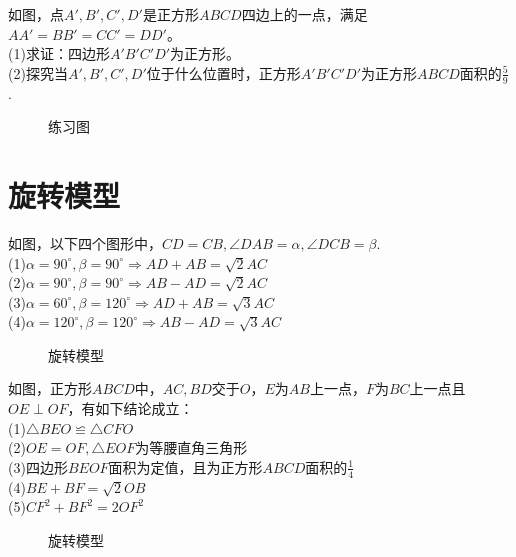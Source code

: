 \begin{problem}
如图，点$A',B',C',D'$是正方形$ABCD$四边上的一点，满足$AA'=BB'=CC'=DD'$。\\
(1)求证：四边形$A'B'C'D'$为正方形。 \\
(2)探究当$A',B',C',D'$位于什么位置时，正方形$A'B'C'D'$为正方形$ABCD$面积的$\frac{5}{9}$. \\
\end{problem}
\begin{figure}[H]
    \centering
    \resizebox{4cm}{!}{}
    \caption{练习图}
\end{figure}
\clearpage
\section{旋转模型}
\begin{definition}
    如图，以下四个图形中，$CD=CB,\angle DAB=\alpha,\angle DCB=\beta$.\\
    (1)$\alpha=90^\circ,\beta=90^\circ\Rightarrow AD+AB=\sqrt2 AC$ \\
    (2)$\alpha=90^\circ,\beta=90^\circ\Rightarrow AB-AD=\sqrt2 AC$ \\
    (3)$\alpha=60^\circ,\beta=120^\circ\Rightarrow AD+AB=\sqrt3 AC$ \\
    (4)$\alpha=120^\circ,\beta=120^\circ\Rightarrow AB-AD=\sqrt3 AC$ \\
\end{definition}
\begin{figure}[H]
    \centering
    \resizebox{12cm}{!}{}
    \caption{旋转模型}
\end{figure}
\begin{definition}
    如图，正方形$ABCD$中，$AC,BD$交于$O$，$E$为$AB$上一点，$F$为$BC$上一点且$OE\perp OF$，有如下结论成立：\\
    (1)$\triangle BEO \backcong \triangle CFO$ \\
    (2)$OE=OF,\triangle EOF$为等腰直角三角形 \\
    (3)四边形$BEOF$面积为定值，且为正方形$ABCD$面积的$\frac{1}{4}$ \\
    (4)$BE+BF=\sqrt2 OB$ \\
    (5)$CF^2+BF^2=2OF^2$ \\
\end{definition}
\begin{figure}[H]
    \centering
    \resizebox{3cm}{!}{}
    \caption{旋转模型}
\end{figure}
